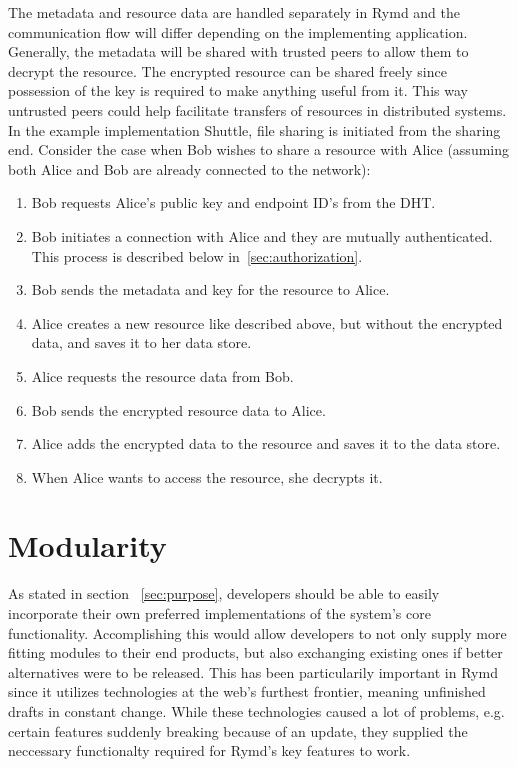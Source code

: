The metadata and resource data are handled separately in Rymd and the communication flow will differ depending on the implementing application. Generally, the metadata will be shared with trusted peers to allow them to decrypt the resource. The encrypted resource can be shared freely since possession of the key is required to make anything useful from it. This way untrusted peers could help facilitate transfers of resources in distributed systems. In the example implementation Shuttle, file sharing is initiated from the sharing end. Consider the case when Bob wishes to share a resource with Alice (assuming both Alice and Bob are already connected to the network):
\begin{enumerate}
  \item Bob requests Alice's public key and endpoint ID's from the DHT.
  \item Bob initiates a connection with Alice and they are mutually authenticated. This process is described below in~\ref{sec:authorization}.
  \item Bob sends the metadata and key for the resource to Alice.
  \item Alice creates a new resource like described above, but without the encrypted data, and saves it to her data store.
  \item Alice requests the resource data from Bob.
  \item Bob sends the encrypted resource data to Alice.
  \item Alice adds the encrypted data to the resource and saves it to the data store.
  \item When Alice wants to access the resource, she decrypts it.
\end{enumerate}

\section{Modularity}


As stated in section ~\ref{sec:purpose}, developers should be able to easily incorporate their own preferred implementations of the system's core functionality. Accomplishing this would allow developers to not only supply more fitting modules to their end products, but also exchanging existing ones if better alternatives were to be released. This has been particularily important in Rymd since it utilizes technologies at the web's furthest frontier, meaning unfinished drafts in constant change. While these technologies caused a lot of problems, e.g. certain features suddenly breaking because of an update, they supplied the neccessary functionalty required for Rymd's key features to work.

